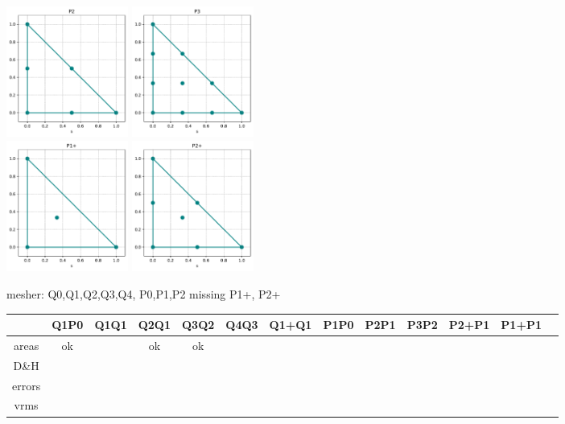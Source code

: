\begin{center}
\includegraphics[width=4cm]{python_codes/fieldstone_120/spaces/P2_nodes}
\includegraphics[width=4cm]{python_codes/fieldstone_120/spaces/P3_nodes}\\
\includegraphics[width=4cm]{python_codes/fieldstone_120/spaces/P1+_nodes}
\includegraphics[width=4cm]{python_codes/fieldstone_120/spaces/P2+_nodes}
\end{center}

mesher: Q0,Q1,Q2,Q3,Q4, P0,P1,P2   missing P1+, P2+

\begin{tabular}{ccccccccccccc}
      & Q1P0 & Q1Q1 & Q2Q1 & Q3Q2 & Q4Q3 & Q1+Q1 & P1P0 & P2P1 & P3P2 & P2+P1 & P1+P1 \\
\hline
areas  & ok & & ok & ok &&&&&& \\ 
D\&H   &  \\
errors &  \\
vrms   &  \\
\hline
\end{tabular}


